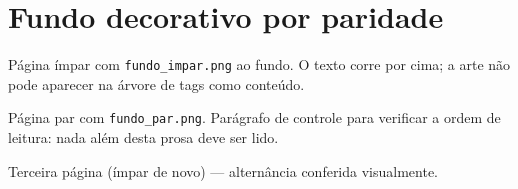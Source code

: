 \documentclass[11pt,a5paper,twoside,openany]{book}
\begin{document}
\chapter{Fundo decorativo por paridade}

Página ímpar com \texttt{fundo\_impar.png} ao fundo. O texto corre
por cima; a arte não pode aparecer na árvore de tags como conteúdo.

\newpage
Página par com \texttt{fundo\_par.png}. Parágrafo de controle para
verificar a ordem de leitura: nada além desta prosa deve ser lido.

\newpage
Terceira página (ímpar de novo) — alternância conferida visualmente.
\end{document}
